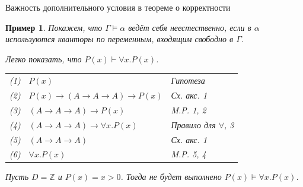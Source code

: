 \documentclass[aspectratio=169]{beamer}
\newtheorem{exmp}{Пример}[section]
\begin{document}
\begin{frame}{Важность дополнительного условия в теореме о корректности}
\begin{exmp}Покажем, что $\Gamma\models\alpha$ ведёт себя неестественно, если 
в $\alpha$ используются кванторы по переменным, входящим свободно в $\Gamma$.\pause

Легко показать, что $P(x)\vdash \forall x.P(x)$. \pause
\begin{tabular}{lll}
(1) & $P(x)$ & Гипотеза \\
(2) & $P(x)\rightarrow (A\rightarrow A \rightarrow A) \rightarrow P(x)$ & Сх. акс. 1\\
(3) & $(A\rightarrow A \rightarrow A) \rightarrow P(x)$ & M.P. 1, 2\\
(4) & $(A\rightarrow A \rightarrow A) \rightarrow \forall x.P(x)$ & Правило для $\forall$, 3\\
(5) & $(A\rightarrow A \rightarrow A)$ & Сх. акс. 1\\
(6) & $\forall x.P(x)$ & M.P. 5, 4
\end{tabular}\pause

Пусть $D = \mathbb{Z}$ и $P(x) = x > 0$. Тогда не будет выполнено $P(x)\models \forall x.P(x)$.
\end{exmp}
\end{frame}
\end{document}
